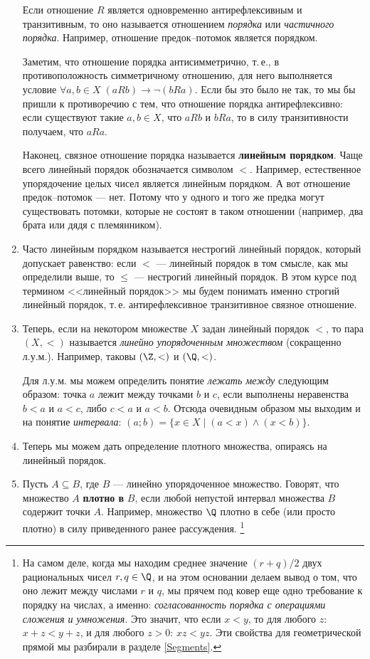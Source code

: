 \begin{enumerate}
Если отношение $R$ является одновременно антирефлексивным и транзитивным, то оно называется отношением \textit{порядка} или \textit{частичного порядка}. Например, отношение предок--потомок является порядком.

Заметим, что отношение порядка антисимметрично, т.\,е., в противоположность симметричному отношению, для него выполняется условие $\forall a,b\in X\;(aRb)\to\neg(bRa)$. Если бы это было не так, то мы бы пришли к противоречию с тем, что отношение порядка антирефлексивно: если существуют такие $a,b\in X$, что $aRb$ и $bRa$, то в силу транзитивности получаем, что $aRa$.

Наконец, связное отношение порядка называется \textbf{линейным порядком}. Чаще всего линейный порядок обозначается символом $<$. Например, естественное упорядочение целых чисел является линейным порядком. А вот отношение предок--потомок --- нет. Потому что у одного и того же предка могут существовать потомки, которые не состоят в таком отношении (например, два брата или дядя с племянником).

\item Часто линейным порядком называется нестрогий линейный порядок, который допускает равенство: если $<$ --- линейный порядок в том смысле, как мы определили выше, то $\le$ --- нестрогий линейный порядок. В этом курсе под термином <<линейный порядок>> мы будем понимать именно строгий линейный порядок, т.\,е. антирефлексивное транзитивное связное отношение.

\item Теперь, если на некотором множестве $X$ задан линейный порядок $<$, то пара $(X,<)$ называется \textit{линейно упорядоченным множеством} (сокращенно л.у.м.). Например, таковы $(\Z,<)$ и $(\Q,<)$.

Для л.у.м. мы можем определить понятие \textit{лежать между} следующим образом: точка $a$ лежит между точками $b$ и $c$, если выполнены неравенства $b<a$ и $a<c$, либо $c<a$ и $a<b$. Отсюда очевидным образом мы выходим и на понятие \textit{интервала}: $(a;b)=\{x\in X\mid (a<x)\land (x<b)\}$.

\item Теперь мы можем дать определение плотного множества, опираясь на линейный порядок.

\item Пусть $A\subseteq B$, где $B$ --- линейно упорядоченное множество. Говорят, что множество $A$ \textbf{плотно в} $B$, если любой непустой интервал множества $B$ содержит точки $A$.
Например, множество $\Q$ плотно в себе (или просто плотно) в силу приведенного ранее рассуждения.
\footnote{На самом деле, когда мы находим среднее значение $(r+q)/2$ двух рациональных чисел $r,q\in\Q$, и на этом основании делаем вывод о том, что оно лежит между числами $r$ и $q$, мы прячем под ковер еще одно требование к порядку на числах, а именно: \textit{согласованность порядка с операциями сложения и умножения}.
Это значит, что если $x<y$, то для любого $z$: $x+z<y+z$, и для любого $z>0$: $xz<yz$. Эти свойства для геометрической прямой мы разбирали в разделе \ref{Segments}.}


\end{enumerate}
